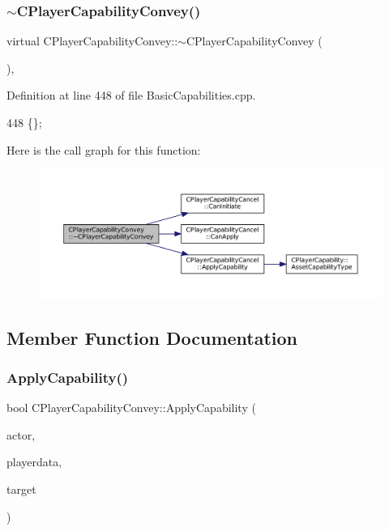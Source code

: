 \subsubsection{\texorpdfstring{$\sim$\+C\+Player\+Capability\+Convey()}{~CPlayerCapabilityConvey()}}
{\footnotesize\ttfamily virtual C\+Player\+Capability\+Convey\+::$\sim$\+C\+Player\+Capability\+Convey (\begin{DoxyParamCaption}{ }\end{DoxyParamCaption})\hspace{0.3cm}{\ttfamily [inline]}, {\ttfamily [virtual]}}



Definition at line 448 of file Basic\+Capabilities.\+cpp.


\begin{DoxyCode}
448 \{\};
\end{DoxyCode}
Here is the call graph for this function\+:
\nopagebreak
\begin{figure}[H]
\begin{center}
\leavevmode
\includegraphics[width=350pt]{classCPlayerCapabilityConvey_a687e07da4e0f552bd0629183c407229f_cgraph}
\end{center}
\end{figure}


\subsection{Member Function Documentation}
\hypertarget{classCPlayerCapabilityConvey_ad05e5ab950872e685fb9449592f7f5a9}{}\label{classCPlayerCapabilityConvey_ad05e5ab950872e685fb9449592f7f5a9} 
\subsubsection{\texorpdfstring{Apply\+Capability()}{ApplyCapability()}}
{\footnotesize\ttfamily bool C\+Player\+Capability\+Convey\+::\+Apply\+Capability (\begin{DoxyParamCaption}\item[{std\+::shared\+\_\+ptr$<$ \hyperlink{classCPlayerAsset}{C\+Player\+Asset} $>$}]{actor,  }\item[{std\+::shared\+\_\+ptr$<$ \hyperlink{classCPlayerData}{C\+Player\+Data} $>$}]{playerdata,  }\item[{std\+::shared\+\_\+ptr$<$ \hyperlink{classCPlayerAsset}{C\+Player\+Asset} $>$}]{target }\end{DoxyParamCaption})\hspace{0.3cm}{\ttfamily [virtual]}}



